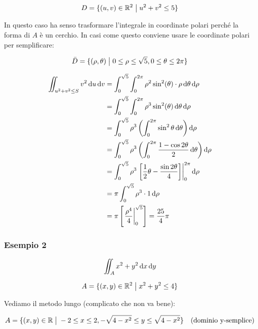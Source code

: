 \[
    D= \{(u,v) \in \mathbb{R}^2 \;\big|\; u^{2}+v^{2} \le 5\}
\]

In questo caso ha senso trasformare l'integrale in coordinate polari perché la forma di \(A\) è un cerchio. In casi come questo conviene usare le coordinate polari per semplificare:

\[
    \bar{D} = \{(\rho,\theta) \;\big|\; 0 \le \rho \le \sqrt{5}, 0 \le \theta \le 2\pi \}
\]

\begin{align*}
    \iint_{u^{2}+v^{2} \le S} {v ^{2}} \diff{u}\diff{v} & = \int_{0}^{\sqrt{5}} \int_{0}^{2\pi} \rho^{2} \sin^{2} (\theta) \cdot \rho \diff{\theta}\diff{\rho}                  \\
                                                        & = \int_{0}^{\sqrt{5}} \int_{0}^{2\pi} \rho^{3} \sin^{2} (\theta) \diff{\theta}\diff{\rho}                             \\
                                                        & = \int_{0}^{\sqrt{5}} \rho^{3} \left( \int_{0}^{2\pi} \sin ^{2} \theta \diff{\theta} \right) \diff{\rho}              \\
                                                        & = \int_{0}^{\sqrt{5}} \rho^{3} \left( \int_{0}^{2\pi} \frac{1- \cos 2 \theta}{2} \diff{\theta} \right) \diff{\rho}    \\
                                                        & = \int_{0}^{\sqrt{5}} \rho^{3} \Eval{\left[ \frac{1}{2} \theta - \frac{\sin 2 \theta}{4}\right]}{0}{2\pi} \diff{\rho} \\
                                                        & = \pi \int_{0}^{\sqrt{5}} \rho^{3} \cdot 1 \diff{\rho}                                                                \\
                                                        & = \pi \left[\Eval{ \frac{\rho^{4}}{4} }{0}{\sqrt{5}}\right] = \frac{25}{4}\pi
\end{align*}

\pagebreak
\subsubsection*{Esempio 2}

\[
    \iint_A {x^{2}+y^{2}} \mathop{}\!\mathrm{d}{x}\mathop{}\!\mathrm{d}{y}
\]

\[
    A = \{(x,y) \in \mathbb{R}^2 \;\big|\; x^{2} + y^{2} \le 4\}
\]

Vediamo il metodo lungo (complicato che non va bene):

\[
    A = \{(x,y) \in \mathbb{R} \;\big|\; -2 \le x \le 2, - \sqrt{4-x^{2}} \le  y \le \sqrt{4 -x^{2}}\} \quad\text{(dominio y-semplice)}
\]

